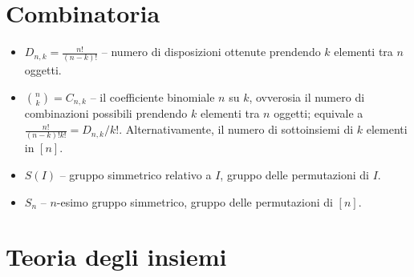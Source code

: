 \begin{multicols*}{2}
    \section*{Combinatoria}

    \begin{itemize}
        \item $D_{n,k} = \frac{n!}{(n-k)!}$ -- numero di disposizioni ottenute prendendo
        $k$ elementi tra $n$ oggetti.
        \item $\binom{n}{k} = C_{n,k}$ -- il coefficiente binomiale $n$ su $k$,
        ovverosia il numero di combinazioni possibili prendendo $k$ elementi tra $n$ oggetti; equivale a $\frac{n!}{(n-k)!k!} = D_{n,k}/k!$. Alternativamente,
        il numero di sottoinsiemi di $k$ elementi in $[n]$.
        \item $S(I)$ -- gruppo simmetrico relativo a $I$, gruppo delle permutazioni
        di $I$.
        \item $S_n$ -- $n$-esimo gruppo simmetrico, gruppo delle permutazioni
        di $[n]$.
    \end{itemize}

    \section*{Teoria degli insiemi}


\end{multicols*}

